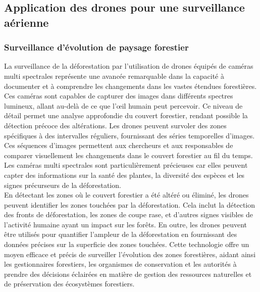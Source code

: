 \subsection{Application des drones pour une surveillance aérienne}
\subsubsection{Surveillance d’évolution de paysage forestier}
La surveillance de la déforestation par l'utilisation de drones équipés de caméras multi spectrales représente une avancée remarquable dans la capacité à documenter et à comprendre les changements dans les vastes étendues forestières. Ces caméras sont capables de capturer des images dans différents spectres lumineux, allant au-delà de ce que l'œil humain peut percevoir. Ce niveau de détail permet une analyse approfondie du couvert forestier, rendant possible la détection précoce des altérations. Les drones peuvent survoler des zones spécifiques à des intervalles réguliers, fournissant des séries temporelles d'images. Ces séquences d'images permettent aux chercheurs et aux responsables de comparer visuellement les changements dans le couvert forestier au fil du temps. Les caméras multi spectrales sont particulièrement précieuses car elles peuvent capter des informations sur la santé des plantes, la diversité des espèces et les signes précurseurs de la déforestation.
\\

En détectant les zones où le couvert forestier a été altéré ou éliminé, les drones peuvent identifier les zones touchées par la déforestation. Cela inclut la détection des fronts de déforestation, les zones de coupe rase, et d'autres signes visibles de l'activité humaine ayant un impact sur les forêts. En outre, les drones peuvent être utilisés pour quantifier l'ampleur de la déforestation en fournissant des données précises sur la superficie des zones touchées. Cette technologie offre un moyen efficace et précis de surveiller l'évolution des zones forestières, aidant ainsi les gestionnaires forestiers, les organismes de conservation et les autorités à prendre des décisions éclairées en matière de gestion des ressources naturelles et de préservation des écosystèmes forestiers. 

